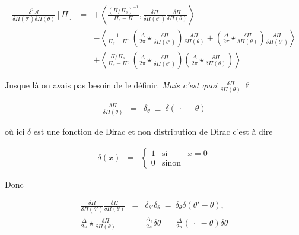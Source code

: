 \begin{aff}
\begin{eqnarray*}
	\frac{\delta^2 \mathcal{A}}{\delta \Pi(\theta') \delta \Pi(\theta) }[\Pi] & = & +\left \langle \frac{ (\Pi/\Pi_s)^{-1}}{\Pi_s - \Pi }  , \frac{\delta \Pi }{\delta \Pi (\theta') } \frac{\delta \Pi }{\delta \Pi (\theta)}  \right \rangle\\
	& & - \left \langle \frac{ 1}{\Pi_s - \Pi }  , \left( \frac{\Delta}{2\pi} \star  \frac{\delta \Pi }{\delta \Pi (\theta') } \right )  \frac{\delta \Pi }{\delta \Pi (\theta)}   +  \left( \frac{\Delta}{2\pi} \star  \frac{\delta \Pi }{\delta \Pi (\theta) } \right )\frac{\delta \Pi }{\delta \Pi (\theta') } \right \rangle\\
	& & +\left \langle \frac{ \Pi/\Pi_s}{\Pi_s - \Pi }  , \left( \frac{\Delta}{2\pi} \star  \frac{\delta \Pi }{\delta \Pi (\theta') } \right ) \left( \frac{\Delta}{2\pi} \star  \frac{\delta \Pi }{\delta \Pi (\theta) } \right )  \right \rangle
\end{eqnarray*}
\end{aff}


Jusque là on avais pas besoin de le définir. {\em Mais c'est quoi $\displaystyle \frac{\delta \Pi }{\delta \Pi (\theta)}$ ?}

\begin{eqnarray*}
	\frac{\delta \Pi }{\delta \Pi (\theta)} & = & \delta_\theta  ~\equiv~ \delta ( ~\cdot ~ - \theta ) 	
\end{eqnarray*}

où ici $\delta$ est une fonction de Dirac et  non distribution de Dirac c'est à dire 

\begin{eqnarray*}
	\delta (x) & = & \left \{ \begin{array}{rcl} 1 & \mbox{si} & x =0 \\ 0 & \mbox{sinon}\end{array} \right .	
\end{eqnarray*}

Donc 

\begin{eqnarray*}
	\frac{\delta \Pi }{\delta \Pi (\theta') } \frac{\delta \Pi }{\delta \Pi (\theta)} & = & 	\delta_{\theta'}\delta_\theta ~=~ \delta_\theta \delta ( \theta' - \theta ) ,\\
	\frac{\Delta}{2\pi} \star  \frac{\delta \Pi }{\delta \Pi (\theta) } & = & \frac{\Delta_\theta}{2\pi} \delta \theta  ~ = ~	\frac{\Delta}{2\pi} ( ~\cdot ~- \theta )  \delta \theta 
\end{eqnarray*}

